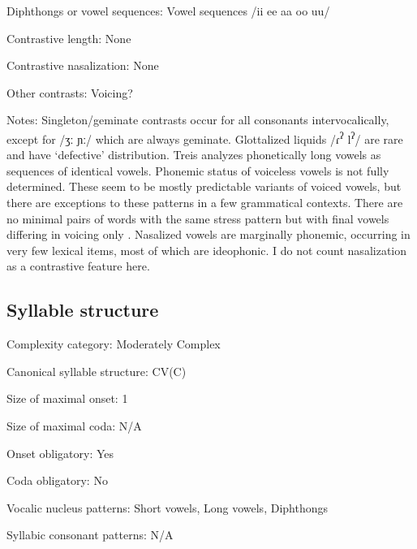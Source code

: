 {\begin{appendixdesc}
\item[Diphthongs or vowel sequences:] Vowel sequences /ii ee aa oo uu/

\item[Contrastive length:] None

\item[Contrastive nasalization:] None

\item[Other contrasts:] Voicing?

\item[Notes:] Singleton/geminate contrasts occur for all consonants intervocalically, except for /ʒː ɲː/ which are always geminate. Glottalized liquids /ɾ\textsuperscript{ʔ} l\textsuperscript{ʔ}/ are rare and have ‘defective’ distribution. Treis analyzes phonetically long vowels as sequences of identical vowels. Phonemic status of voiceless vowels is not fully determined. These seem to be mostly predictable variants of voiced vowels, but there are exceptions to these patterns in a few grammatical contexts. There are no minimal pairs of words with the same stress pattern but with final vowels differing in voicing only \citep[20--22]{Treis2008}. Nasalized vowels are marginally phonemic, occurring in very few lexical items, most of which are ideophonic. I do not count nasalization as a contrastive feature here.
\end{appendixdesc}
\subsection*{Syllable structure}
\begin{appendixdesc}

\item[Complexity category:] Moderately Complex

\item[Canonical syllable structure:] CV(C) \citep[41]{Treis2008}

\item[Size of maximal onset:] 1

\item[Size of maximal coda:] N/A

\item[Onset obligatory:] Yes

\item[Coda obligatory:] No

\item[Vocalic nucleus patterns:] Short vowels, Long vowels, Diphthongs

\item[Syllabic consonant patterns:] N/A


\end{appendixdesc}}
